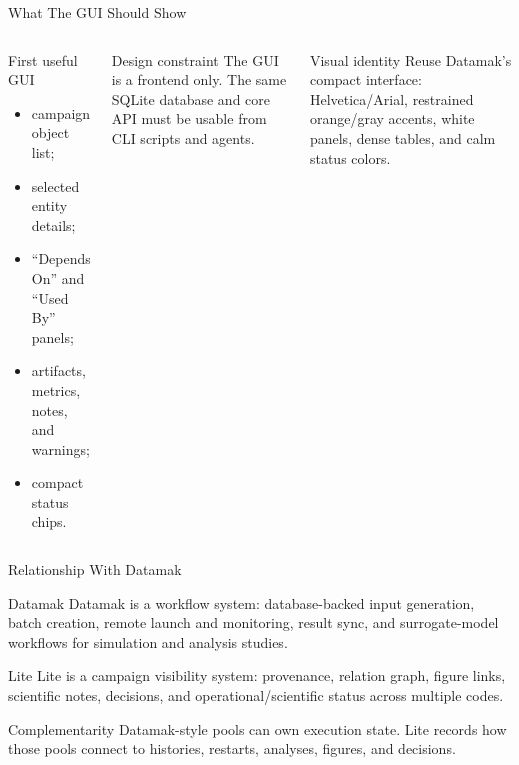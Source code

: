 \documentclass[aspectratio=169,11pt]{beamer}
\begin{document}
\begin{frame}{What The GUI Should Show}
  \begin{columns}[T]
    \begin{block}{First useful GUI}
      \small
      \begin{itemize}
        \item campaign object list;
        \item selected entity details;
        \item ``Depends On'' and ``Used By'' panels;
        \item artifacts, metrics, notes, and warnings;
        \item compact status chips.
      \end{itemize}
    \end{block}

    \begin{block}{Design constraint}
      \small
      The GUI is a frontend only.  The same SQLite database and core API must
      be usable from CLI scripts and agents.
    \end{block}

    \begin{block}{Visual identity}
      \small
      Reuse Datamak's compact interface: Helvetica/Arial, restrained
      orange/gray accents, white panels, dense tables, and calm status colors.
    \end{block}
  \end{columns}
\end{frame}

\begin{frame}{Relationship With Datamak}
  \begin{block}{Datamak}
    \small
    Datamak is a workflow system: database-backed input generation, batch
    creation, remote launch and monitoring, result sync, and surrogate-model
    workflows for simulation and analysis studies.
  \end{block}

  \begin{block}{Lite}
    \small
    Lite is a campaign visibility system: provenance, relation graph, figure
    links, scientific notes, decisions, and operational/scientific status across
    multiple codes.
  \end{block}

  \begin{block}{Complementarity}
    \small
    Datamak-style pools can own execution state.  Lite records how those pools
    connect to histories, restarts, analyses, figures, and decisions.
  \end{block}
\end{frame}
\end{document}
